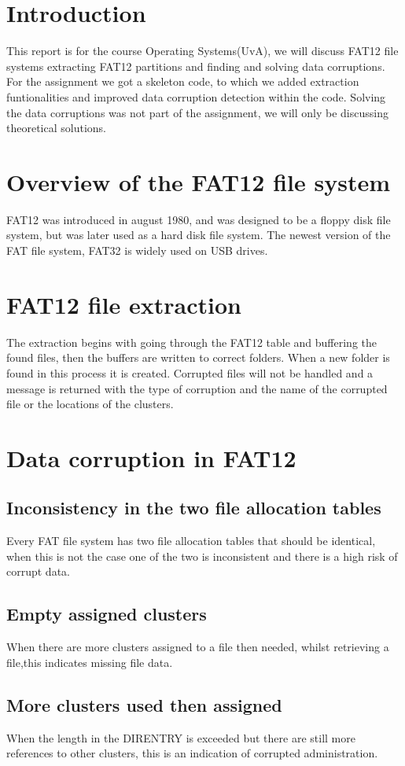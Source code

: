 \documentclass[pdftex,12pt,a4paper]{article}
\begin{document}
\section{Introduction}
This report is for the course Operating Systems(UvA), we will discuss FAT12 file systems extracting FAT12 partitions and finding and solving data corruptions. For the assignment we got a skeleton code, to which we added extraction funtionalities and improved data corruption detection within the code. Solving the data corruptions was not part of the assignment, we will only be discussing theoretical solutions.
\section{Overview of the FAT12 file system}
FAT12 was introduced in august 1980, and was designed to be a floppy disk file system, but was later used as a hard disk file system. The newest version of the FAT file system, FAT32 is widely used on USB drives.
\section{FAT12 file extraction}
The extraction begins with going through the FAT12 table and buffering the found files, then the buffers are written to correct folders. When a new folder is found in this process it is created. Corrupted files will not be handled and a message is returned with the type of corruption and the name of the corrupted file or the locations of the clusters.
\section{Data corruption in FAT12}
\subsection{Inconsistency in the two file allocation tables}
Every FAT file system has two file allocation tables that should be identical, when this is not the case one of the two is inconsistent and there is a high risk of corrupt data.
\subsection{Empty assigned clusters}
When there are more clusters assigned to a file then needed, whilst retrieving a file,this indicates missing file data. 
\subsection{More clusters used then assigned}
When the length in the DIRENTRY is exceeded but there are still more references to other clusters, this is an indication of corrupted administration.
\end{document}
